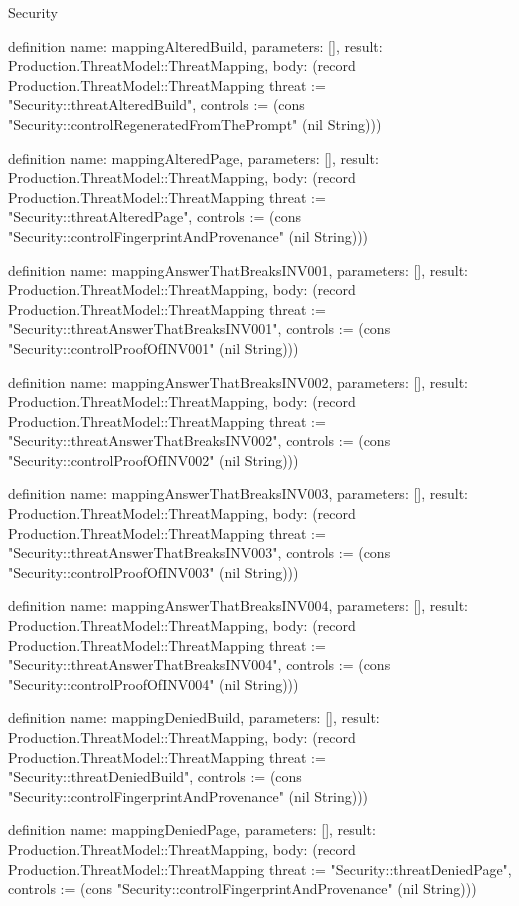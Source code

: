 \begin{lexlean}{Security}
\begin{semanticmodule}
definition{
  name: mappingAlteredBuild,
  parameters: [],
  result: Production.ThreatModel::ThreatMapping,
  body: (record Production.ThreatModel::ThreatMapping {threat := "Security::threatAlteredBuild", controls := (cons "Security::controlRegeneratedFromThePrompt" (nil String))})
}

definition{
  name: mappingAlteredPage,
  parameters: [],
  result: Production.ThreatModel::ThreatMapping,
  body: (record Production.ThreatModel::ThreatMapping {threat := "Security::threatAlteredPage", controls := (cons "Security::controlFingerprintAndProvenance" (nil String))})
}

definition{
  name: mappingAnswerThatBreaksINV001,
  parameters: [],
  result: Production.ThreatModel::ThreatMapping,
  body: (record Production.ThreatModel::ThreatMapping {threat := "Security::threatAnswerThatBreaksINV001", controls := (cons "Security::controlProofOfINV001" (nil String))})
}

definition{
  name: mappingAnswerThatBreaksINV002,
  parameters: [],
  result: Production.ThreatModel::ThreatMapping,
  body: (record Production.ThreatModel::ThreatMapping {threat := "Security::threatAnswerThatBreaksINV002", controls := (cons "Security::controlProofOfINV002" (nil String))})
}

definition{
  name: mappingAnswerThatBreaksINV003,
  parameters: [],
  result: Production.ThreatModel::ThreatMapping,
  body: (record Production.ThreatModel::ThreatMapping {threat := "Security::threatAnswerThatBreaksINV003", controls := (cons "Security::controlProofOfINV003" (nil String))})
}

definition{
  name: mappingAnswerThatBreaksINV004,
  parameters: [],
  result: Production.ThreatModel::ThreatMapping,
  body: (record Production.ThreatModel::ThreatMapping {threat := "Security::threatAnswerThatBreaksINV004", controls := (cons "Security::controlProofOfINV004" (nil String))})
}

definition{
  name: mappingDeniedBuild,
  parameters: [],
  result: Production.ThreatModel::ThreatMapping,
  body: (record Production.ThreatModel::ThreatMapping {threat := "Security::threatDeniedBuild", controls := (cons "Security::controlFingerprintAndProvenance" (nil String))})
}

definition{
  name: mappingDeniedPage,
  parameters: [],
  result: Production.ThreatModel::ThreatMapping,
  body: (record Production.ThreatModel::ThreatMapping {threat := "Security::threatDeniedPage", controls := (cons "Security::controlFingerprintAndProvenance" (nil String))})
}


\end{semanticmodule}
\end{lexlean}
